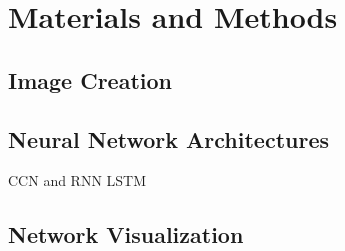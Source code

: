 \section{Materials and Methods}
\label{sec:materials_and_methods}


\subsection{Image Creation}
\subsection{Neural Network Architectures}
CCN
and 
RNN LSTM

\subsection{Network Visualization}
